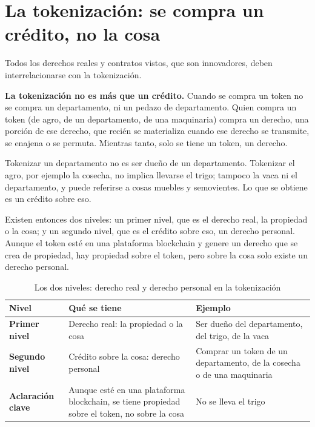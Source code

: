 \documentclass[12pt,oneside]{book}
\begin{document}
\section{La tokenización: se compra un crédito, no la cosa}

Todos los derechos reales y contratos vistos, que son innovadores, deben interrelacionarse con la tokenización.

\begin{important}
\textbf{La tokenización no es más que un crédito.} Cuando se compra un token no se compra un departamento, ni un pedazo de departamento. Quien compra un token (de agro, de un departamento, de una maquinaria) compra un derecho, una porción de ese derecho, que recién se materializa cuando ese derecho se transmite, se enajena o se permuta. Mientras tanto, solo se tiene un token, un derecho.
\end{important}

Tokenizar un departamento no es ser dueño de un departamento. Tokenizar el agro, por ejemplo la cosecha, no implica llevarse el trigo; tampoco la vaca ni el departamento, y puede referirse a cosas muebles y semovientes. Lo que se obtiene es un crédito sobre eso.

Existen entonces dos niveles: un primer nivel, que es el derecho real, la propiedad o la cosa; y un segundo nivel, que es el crédito sobre eso, un derecho personal. Aunque el token esté en una plataforma blockchain y genere un derecho que se crea de propiedad, hay propiedad sobre el token, pero sobre la cosa solo existe un derecho personal.

\begin{table}[H]
\centering
\small
\begin{tabularx}{\textwidth}{>{\raggedright\arraybackslash}p{2.8cm}YY}
\toprule
\textbf{Nivel} & \textbf{Qué se tiene} & \textbf{Ejemplo} \\
\midrule
\textbf{Primer nivel} & Derecho real: la propiedad o la cosa & Ser dueño del departamento, del trigo, de la vaca \\
\textbf{Segundo nivel} & Crédito sobre la cosa: derecho personal & Comprar un token de un departamento, de la cosecha o de una maquinaria \\
\textbf{Aclaración clave} & Aunque esté en una plataforma blockchain, se tiene propiedad sobre el token, no sobre la cosa & No se lleva el trigo \\
\bottomrule
\end{tabularx}
\caption{Los dos niveles: derecho real y derecho personal en la tokenización}
\end{table}
\end{document}
